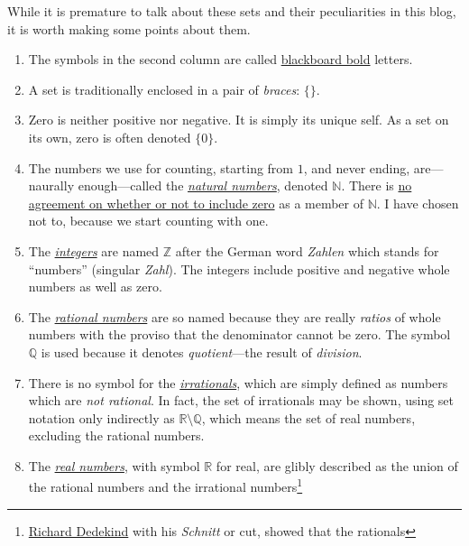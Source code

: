 \documentclass[
  a4paper,
]{article}
\begin{document}
\hfill\break
While it is premature to talk about these sets and their peculiarities
in this blog, it is worth making some points about them.

\begin{enumerate}
\item
  The symbols in the second column are called
  \href{https://oeis.org/wiki/Blackboard_bold}{blackboard bold} letters.
\item
  A set is traditionally enclosed in a pair of \emph{braces}: \(\{\}\).
\item
  Zero is neither positive nor negative. It is simply its unique self.
  As a set on its own, zero is often denoted \(\{0\}\).
\item
  The numbers we use for counting, starting from \(1\), and never
  ending, are---naurally enough---called the
  \href{https://mathworld.wolfram.com/NaturalNumber.html}{\emph{natural
  numbers}}, denoted \(\mathbb{N}\). There is
  \href{https://en.wikipedia.org/wiki/Natural_number}{no agreement on
  whether or not to include zero} as a member of \(\mathbb{N}\). I have
  chosen not to, because we start counting with one.
\item
  The \href{https://en.wikipedia.org/wiki/Integer}{\emph{integers}} are
  named \(\mathbb{Z}\) after the German word \emph{Zahlen} which stands
  for ``numbers'' (singular \emph{Zahl}). The integers include positive
  and negative whole numbers as well as zero.
\item
  The
  \href{https://mathworld.wolfram.com/RationalNumber.html}{\emph{rational
  numbers}} are so named because they are really \emph{ratios} of whole
  numbers with the proviso that the denominator cannot be zero. The
  symbol \(\mathbb{Q}\) is used because it denotes \emph{quotient}---the
  result of \emph{division}.
\item
  There is no symbol for the
  \href{https://mathworld.wolfram.com/IrrationalNumber.html}{\emph{irrationals}},
  which are simply defined as numbers which are \emph{not rational}. In
  fact, the set of irrationals may be shown, using set notation only
  indirectly as \(\mathbb{R}\setminus\mathbb{Q}\), which means the set
  of real numbers, excluding the rational numbers.
\item
  The \href{https://en.wikipedia.org/wiki/Real_number}{\emph{real
  numbers}}, with symbol \(\mathbb{R}\) for real, are glibly described
  as the union of the rational numbers and the irrational
  numbers\footnote{\href{https://en.wikipedia.org/wiki/Richard_Dedekind}{Richard
    Dedekind} with his \emph{Schnitt} or cut, showed that the rationals
}
\end{enumerate}
\end{document}
